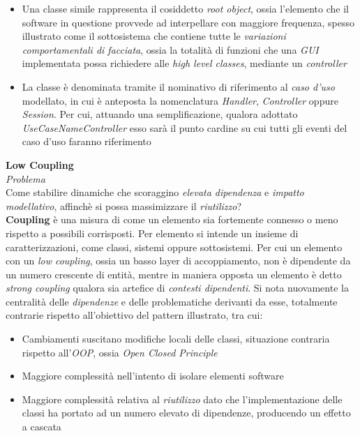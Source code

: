 \documentclass{article}
\begin{document}
\begin{itemize}[label={-}]
    \itemsep0em
    \item Una classe simile rappresenta il cosiddetto \textit{root object}, ossia l'elemento che il software in questione provvede ad interpellare con maggiore frequenza, spesso illustrato come il sottosistema che contiene tutte le \textit{variazioni comportamentali di facciata}, ossia la totalità di funzioni che una \textit{GUI} implementata possa richiedere alle \textit{high level classes}, mediante un \textit{controller}
    \item La classe è denominata tramite il nominativo di riferimento al \textit{caso d'uso} modellato, in cui è anteposta la nomenclatura \textit{Handler}, \textit{Controller} oppure \textit{Session}. Per cui, attuando una semplificazione, qualora adottato \textit{UseCaseNameController} esso sarà il punto cardine su cui tutti gli eventi del caso d'uso faranno riferimento
\end{itemize}\vspace*{7pt}
\textbf{Low Coupling}\vspace*{7pt}\\
\textit{Problema}\\
Come stabilire dinamiche che scoraggino \textit{elevata dipendenza} e \textit{impatto modellativo}, affinchè si possa massimizzare il \textit{riutilizzo}?\vspace*{7pt}\\
\textbf{Coupling} è una misura di come un elemento sia fortemente connesso o meno rispetto a possibili corrisposti. Per elemento si intende un insieme di caratterizzazioni, come classi, sistemi oppure sottosistemi. Per cui un elemento con un \textit{low coupling}, ossia un basso layer di accoppiamento, non è dipendente da un numero crescente di entità, mentre in maniera opposta un elemento è detto \textit{strong coupling} qualora sia artefice di \textit{contesti dipendenti}. Si nota nuovamente la centralità delle \textit{dipendenze} e delle problematiche derivanti da esse, totalmente contrarie rispetto all'obiettivo del pattern illustrato, tra cui:
\begin{itemize}[label={-}]
    \itemsep0em
    \item Cambiamenti suscitano modifiche locali delle classi, situazione contraria rispetto all'\textit{OOP}, ossia \textit{Open Closed Principle}
    \item Maggiore complessità nell'intento di isolare elementi software
    \item Maggiore complessità relativa al \textit{riutilizzo} dato che l'implementazione delle classi ha portato ad un numero elevato di dipendenze, producendo un effetto a cascata
\end{itemize}\vspace*{7pt}
\end{document}
